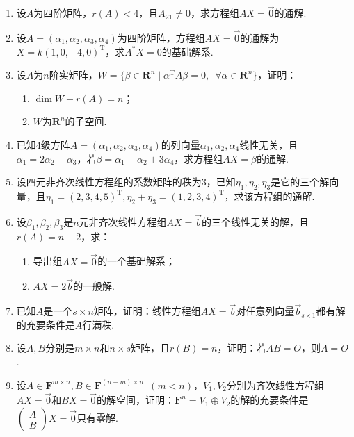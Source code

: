 \begin{enumerate}
    \item 设$A$为四阶矩阵，$r(A)<4$，且$A_{21}\neq 0$，求方程组$AX=\vec{0}$的通解.

    \item 设$A=(\alpha_1,\alpha_2,\alpha_3,\alpha_4)$为四阶矩阵，方程组$AX=\vec{0}$的通解为$X=k(1,0,-4,0)^\mathrm{T}$，求$A^*X=0$的基础解系.

    \item 设$A$为$n$阶实矩阵，$W=\{\beta\in\mathbf{R}^n \mid \alpha^\mathrm{T}A\beta=0,\enspace \forall \alpha\in\mathbf{R}^n\}$，证明：
          \begin{enumerate}
              \item $\dim W+r(A)=n$；

              \item $W$为$\mathbf{R}^n$的子空间.
          \end{enumerate}

    \item 已知4级方阵$A=(\alpha_1,\alpha_2,\alpha_3,\alpha_4)$的列向量$\alpha_1,\alpha_2,\alpha_4$线性无关，且$\alpha_1=2\alpha_2-\alpha_3$，若$\beta=\alpha_1-\alpha_2+3\alpha_4$，求方程组$AX=\beta$的通解.

    \item 设四元非齐次线性方程组的系数矩阵的秩为3，已知$\eta_1,\eta_2,\eta_3$是它的三个解向量，且$\eta_1=(2,3,4,5)^\mathrm{T},\eta_2+\eta_3=(1,2,3,4)^\mathrm{T}$，求该方程组的通解.

    \item 设$\beta_1,\beta_2,\beta_3$是$n$元非齐次线性方程组$AX=\vec{b}$的三个线性无关的解，且$r(A)=n-2$，求：
          \begin{enumerate}
              \item 导出组$AX=\vec{0}$的一个基础解系；

              \item $AX=2\vec{b}$的一般解.
          \end{enumerate}

    \item 已知$A$是一个$s\times n$矩阵，证明：线性方程组$AX=\vec{b}$对任意列向量$\vec{b}_{s\times 1}$都有解的充要条件是$A$行满秩.

    \item 设$A,B$分别是$m \times n$和$n \times s$矩阵，且$r(B)=n$，证明：若$AB=O$，则$A=O$.

    \item 设$A \in \mathbf{F}^{m \times n},B \in \mathbf{F}^{(n-m) \times n}\enspace(m<n)$，$V_1,V_2$分别为齐次线性方程组$AX=\vec{0}$和$BX=\vec{0}$的解空间，证明：$\mathbf{F}^n=V_1\oplus V_2$的解的充要条件是$\begin{pmatrix} A \\ B \end{pmatrix}X=\vec{0}$只有零解.


\end{enumerate}
